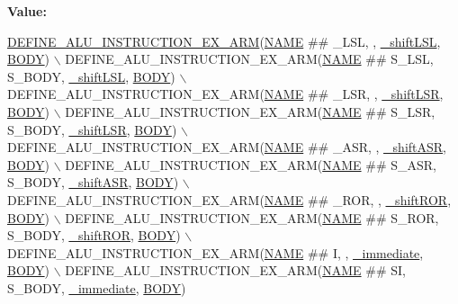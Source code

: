 {\bfseries Value\+:}
\begin{DoxyCode}
\mbox{\hyperlink{isa-arm_8c_af5a7c9d844c906c7f00a6aa651397587}{DEFINE\_ALU\_INSTRUCTION\_EX\_ARM}}(\mbox{\hyperlink{inflate_8h_a164ea0159d5f0b5f12a646f25f99eceaa67bc2ced260a8e43805d2480a785d312}{NAME}} ## \_LSL, , 
      \mbox{\hyperlink{isa-arm_8c_a8d2da5536596dafb6d1b701db5ac6eca}{\_shiftLSL}}, \mbox{\hyperlink{gzlog_8c_aa6bdf6a6d9916c343e1e17774d84a156}{BODY}}) \(\backslash\)
    DEFINE\_ALU\_INSTRUCTION\_EX\_ARM(\mbox{\hyperlink{inflate_8h_a164ea0159d5f0b5f12a646f25f99eceaa67bc2ced260a8e43805d2480a785d312}{NAME}} ## S\_LSL, S\_BODY, \mbox{\hyperlink{isa-arm_8c_a8d2da5536596dafb6d1b701db5ac6eca}{\_shiftLSL}}, 
      \mbox{\hyperlink{gzlog_8c_aa6bdf6a6d9916c343e1e17774d84a156}{BODY}}) \(\backslash\)
    DEFINE\_ALU\_INSTRUCTION\_EX\_ARM(\mbox{\hyperlink{inflate_8h_a164ea0159d5f0b5f12a646f25f99eceaa67bc2ced260a8e43805d2480a785d312}{NAME}} ## \_LSR, , \mbox{\hyperlink{isa-arm_8c_a7477c32e969303bc1b4ae8a83c64d3ac}{\_shiftLSR}}, \mbox{\hyperlink{gzlog_8c_aa6bdf6a6d9916c343e1e17774d84a156}{BODY}}) \(\backslash\)
    DEFINE\_ALU\_INSTRUCTION\_EX\_ARM(\mbox{\hyperlink{inflate_8h_a164ea0159d5f0b5f12a646f25f99eceaa67bc2ced260a8e43805d2480a785d312}{NAME}} ## S\_LSR, S\_BODY, \mbox{\hyperlink{isa-arm_8c_a7477c32e969303bc1b4ae8a83c64d3ac}{\_shiftLSR}}, 
      \mbox{\hyperlink{gzlog_8c_aa6bdf6a6d9916c343e1e17774d84a156}{BODY}}) \(\backslash\)
    DEFINE\_ALU\_INSTRUCTION\_EX\_ARM(\mbox{\hyperlink{inflate_8h_a164ea0159d5f0b5f12a646f25f99eceaa67bc2ced260a8e43805d2480a785d312}{NAME}} ## \_ASR, , \mbox{\hyperlink{isa-arm_8c_aedec32cf3d293a334f38a37b00eaeb06}{\_shiftASR}}, \mbox{\hyperlink{gzlog_8c_aa6bdf6a6d9916c343e1e17774d84a156}{BODY}}) \(\backslash\)
    DEFINE\_ALU\_INSTRUCTION\_EX\_ARM(\mbox{\hyperlink{inflate_8h_a164ea0159d5f0b5f12a646f25f99eceaa67bc2ced260a8e43805d2480a785d312}{NAME}} ## S\_ASR, S\_BODY, \mbox{\hyperlink{isa-arm_8c_aedec32cf3d293a334f38a37b00eaeb06}{\_shiftASR}}, 
      \mbox{\hyperlink{gzlog_8c_aa6bdf6a6d9916c343e1e17774d84a156}{BODY}}) \(\backslash\)
    DEFINE\_ALU\_INSTRUCTION\_EX\_ARM(\mbox{\hyperlink{inflate_8h_a164ea0159d5f0b5f12a646f25f99eceaa67bc2ced260a8e43805d2480a785d312}{NAME}} ## \_ROR, , \mbox{\hyperlink{isa-arm_8c_a7ac9fa3bbd1d0f6e309b9ece3a7f5bd3}{\_shiftROR}}, \mbox{\hyperlink{gzlog_8c_aa6bdf6a6d9916c343e1e17774d84a156}{BODY}}) \(\backslash\)
    DEFINE\_ALU\_INSTRUCTION\_EX\_ARM(\mbox{\hyperlink{inflate_8h_a164ea0159d5f0b5f12a646f25f99eceaa67bc2ced260a8e43805d2480a785d312}{NAME}} ## S\_ROR, S\_BODY, \mbox{\hyperlink{isa-arm_8c_a7ac9fa3bbd1d0f6e309b9ece3a7f5bd3}{\_shiftROR}}, 
      \mbox{\hyperlink{gzlog_8c_aa6bdf6a6d9916c343e1e17774d84a156}{BODY}}) \(\backslash\)
    DEFINE\_ALU\_INSTRUCTION\_EX\_ARM(\mbox{\hyperlink{inflate_8h_a164ea0159d5f0b5f12a646f25f99eceaa67bc2ced260a8e43805d2480a785d312}{NAME}} ## I, , \mbox{\hyperlink{isa-arm_8c_a5948ab4e0f82eb11d17504a8cc5237b7}{\_immediate}}, \mbox{\hyperlink{gzlog_8c_aa6bdf6a6d9916c343e1e17774d84a156}{BODY}}) \(\backslash\)
    DEFINE\_ALU\_INSTRUCTION\_EX\_ARM(\mbox{\hyperlink{inflate_8h_a164ea0159d5f0b5f12a646f25f99eceaa67bc2ced260a8e43805d2480a785d312}{NAME}} ## SI, S\_BODY, \mbox{\hyperlink{isa-arm_8c_a5948ab4e0f82eb11d17504a8cc5237b7}{\_immediate}}, 
      \mbox{\hyperlink{gzlog_8c_aa6bdf6a6d9916c343e1e17774d84a156}{BODY}})
\end{DoxyCode}
